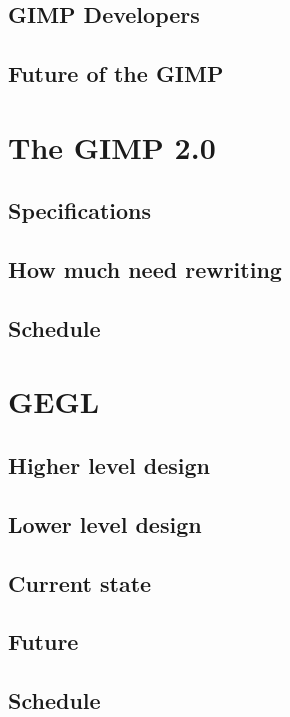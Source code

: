 \documentclass{report}
\begin{document}
\section{GIMP Developers}
\section{Future of the GIMP} 


\chapter{The GIMP 2.0}

\section{Specifications}
\section{How much need rewriting}
\section{Schedule}

\chapter{GEGL}

\section{Higher level design}
\section{Lower level design}
\section{Current state}
\section{Future}
\section{Schedule}
\end{document}
